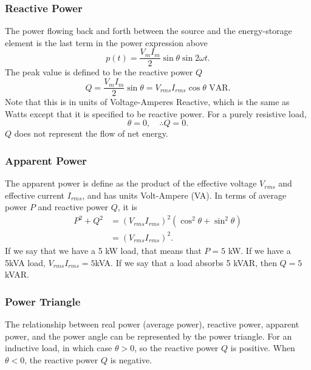 \documentclass{article}
\begin{document}
\subsubsection{Reactive Power}
The power flowing back and forth between the source and the energy-storage element is the last term in the power expression above 
\[
    p(t)=\frac{V_mI_m}{2}\sin\theta \sin 2\omega t.
\]
The peak value is defined to be the reactive power $Q$
\[
    Q=\frac{V_mI_m}{2}\sin\theta =V_{rms}I_{rms}\cos\theta \text{ VAR}.
\]
Note that this is in units of Voltage-Amperes Reactive, which is the same as Watts except that it is specified to be reactive power. For a purely resistive load,
\[
    \theta =0,\quad \therefore Q=0.
\]
$Q$ does not represent the flow of net energy.

\subsubsection{Apparent Power}
The apparent power is define as the product of the effective voltage $V_{rms}$ and effective current $I_{rms}$, and has units Volt-Ampere (VA). In terms of average power $P$ and reactive power $Q$, it is
\begin{align*}
    P^2+Q^2 &= (V_{rms}I_{rms})^2 \left( \cos^2\theta +\sin^2\theta  \right)\\
            &= \left( V_{rms}I_{rms} \right)^2.
\end{align*}
If we say that we have a 5 kW load, that means that $P=5$ kW. If we have a 5kVA load, $V_{rms}I_{rms}=5$kVA. If we say that a load absorbs 5 kVAR, then $Q=5$ kVAR.

\subsubsection{Power Triangle}
The relationship between real power (average power), reactive power, apparent power, and the power angle can be represented by the power triangle. For an inductive load, in which case $\theta >0$, so the reactive power $Q$ is positive. When $\theta <0$, the reactive power $Q$ is negative.
\end{document}
